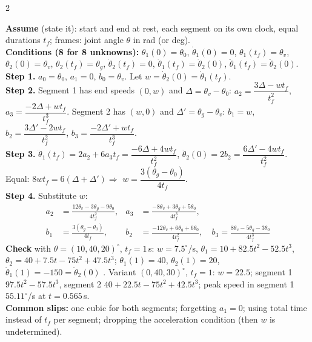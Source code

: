 \begin{multicols}{2}
\begin{examq}
\solution
\textbf{Assume} (state it): start and end at rest, each segment on its own clock, equal durations $t_f$; frames: joint angle $\theta$ in rad (or deg).\\
\textbf{Conditions (8 for 8 unknowns):} $\theta_1(0)=\theta_0$, $\dot\theta_1(0)=0$, $\theta_1(t_f)=\theta_v$, $\theta_2(0)=\theta_v$, $\theta_2(t_f)=\theta_g$, $\dot\theta_2(t_f)=0$, $\dot\theta_1(t_f)=\dot\theta_2(0)$, $\ddot\theta_1(t_f)=\ddot\theta_2(0)$.\\
\textbf{Step 1.} $a_0=\theta_0$, $a_1=0$, $b_0=\theta_v$. Let $w=\dot\theta_2(0)=\dot\theta_1(t_f)$.\\
\textbf{Step 2.} Segment 1 has end speeds $(0,w)$ and $\Delta=\theta_v-\theta_0$: $a_2=\dfrac{3\Delta-wt_f}{t_f^2}$, $a_3=\dfrac{-2\Delta+wt_f}{t_f^3}$. Segment 2 has $(w,0)$ and $\Delta'=\theta_g-\theta_v$: $b_1=w$, $b_2=\dfrac{3\Delta'-2wt_f}{t_f^2}$, $b_3=\dfrac{-2\Delta'+wt_f}{t_f^3}$.\\
\textbf{Step 3.} $\ddot\theta_1(t_f)=2a_2+6a_3t_f=\dfrac{-6\Delta+4wt_f}{t_f^2}$, $\ddot\theta_2(0)=2b_2=\dfrac{6\Delta'-4wt_f}{t_f^2}$. Equal: $8wt_f=6(\Delta+\Delta')\Rightarrow$ $\boxed{w=\dfrac{3(\theta_g-\theta_0)}{4t_f}}$.\\
\textbf{Step 4.} Substitute $w$:
\[\boxed{\begin{aligned}
a_2&=\tfrac{12\theta_v-3\theta_g-9\theta_0}{4t_f^2}, & a_3&=\tfrac{-8\theta_v+3\theta_g+5\theta_0}{4t_f^3},\\
b_1&=\tfrac{3(\theta_g-\theta_0)}{4t_f}, & b_2&=\tfrac{-12\theta_v+6\theta_g+6\theta_0}{4t_f^2},\quad b_3=\tfrac{8\theta_v-5\theta_g-3\theta_0}{4t_f^3}\end{aligned}}\]
\textbf{Check} with $\theta=(10,40,20)^\circ$, $t_f=1$\,s: $w=7.5^\circ$/s, $\theta_1=10+82.5t^2-52.5t^3$, $\theta_2=40+7.5t-75t^2+47.5t^3$; $\theta_1(1)=40$, $\theta_2(1)=20$, $\ddot\theta_1(1)=-150=\ddot\theta_2(0)$ \checkmark. Variant $(0,40,30)^\circ$, $t_f=1$: $w=22.5$; segment 1 $97.5t^2-57.5t^3$, segment 2 $40+22.5t-75t^2+42.5t^3$; peak speed in segment 1 $55.11^\circ$/s at $t=0.565$\,s. \chk\\
\textbf{Common slips:} one cubic for both segments; forgetting $a_1=0$; using total time instead of $t_f$ per segment; dropping the acceleration condition (then $w$ is undetermined).
\end{examq}


\end{multicols}
